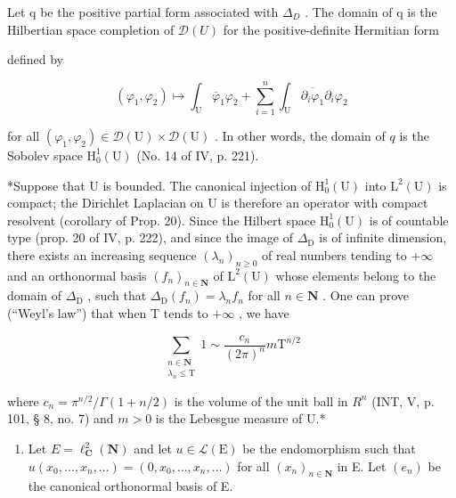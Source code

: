 Let q be the positive partial form associated with \(\Delta_{D}\) . The domain of q is the Hilbertian space completion of \(\mathcal{D}(U)\) for the positive-definite Hermitian form

defined by

\[
(\varphi_ {1}, \varphi_ {2}) \mapsto \int_ {\mathrm{U}} \overline {{\varphi}} _ {1} \varphi_ {2} + \sum_ {i = 1} ^ {n} \int_ {\mathrm{U}} \overline {{\partial_ {i} \varphi_ {1}}} \partial_ {i} \varphi_ {2}
\]

for all \((\varphi_{1},\varphi_{2})\in\mathcal{D}(\mathrm{U})\times\mathcal{D}(\mathrm{U})\) . In other words, the domain of \(q\) is the Sobolev space \(\mathrm{H}_{0}^{1}(\mathrm{U})\) (No. 14 of IV, p. 221).

*Suppose that U is bounded. The canonical injection of \(\mathrm{H}_0^1 (\mathrm{U})\) into \(\mathrm{L}^2 (\mathrm{U})\) is compact; the Dirichlet Laplacian on U is therefore an operator with compact resolvent (corollary of Prop. 20). Since the Hilbert space \(\mathrm{H}_0^1 (\mathrm{U})\) is of countable type (prop. 20 of IV, p. 222), and since the image of \(\Delta_{\mathrm{D}}\) is of infinite dimension, there exists an increasing sequence \((\lambda_n)_{n\geqslant 0}\) of real numbers tending to \(+\infty\) and an orthonormal basis \((f_n)_{n\in \mathbf{N}}\) of \(\mathrm{L}^2 (\mathrm{U})\) whose elements belong to the domain of \(\Delta_{\mathrm{D}}\) , such that \(\Delta_{\mathrm{D}}(f_n) = \lambda_n f_n\) for all \(n\in \mathbf{N}\) . One can prove (“Weyl’s law”) that when T tends to \(+\infty\) , we have

\[
\sum_{\substack{n\in \mathbf{N}\\ \lambda_{n}\leqslant \mathrm{T}}}1\sim \frac{c_{n}}{(2\pi)^{n}} m\mathrm{T}^{n / 2}
\]

where \(c_{n} = \pi^{n/2}/\Gamma(1 + n/2)\) is the volume of the unit ball in \(R^{n}\) (INT, V, p. 101, § 8, no. 7) and \(m > 0\) is the Lebesgue measure of U.*


\exercisesection{}

\begin{enumerate}
\def\labelenumi{\arabic{enumi})}
\tightlist
\item
  Let \(E = \ell_{\mathbf{C}}^{2}(\mathbf{N})\) and let \(u \in \mathcal{L}(\mathrm{E})\) be the endomorphism such that \(u(x_{0}, \ldots, x_{n}, \ldots) = (0, x_{0}, \ldots, x_{n}, \ldots)\) for all \((x_{n})_{n \in \mathbf{N}}\) in E. Let \((e_{n})\) be the canonical orthonormal basis of E.
\end{enumerate}

